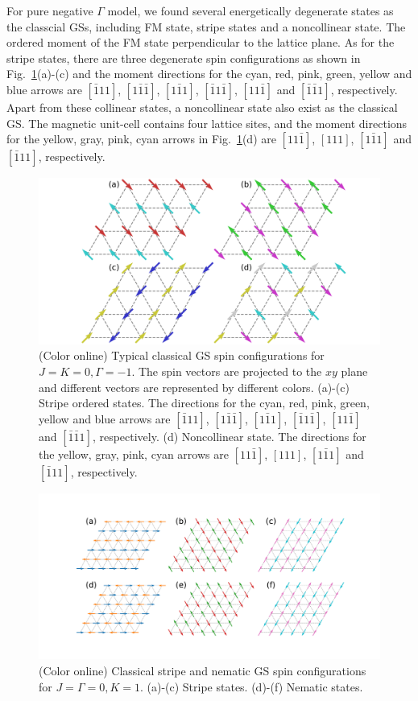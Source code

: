 \documentclass[aps,prb,reprint,amsfonts,amsmath,amssymb,showpacs,groupedaddress,superscriptaddress]{revtex4-1}
\begin{document}
For pure negative $\Gamma$ model, we found several energetically degenerate states as the classcial GSs, including FM state, stripe states and a noncollinear state. The ordered moment of the FM state perpendicular to the lattice plane. As for the stripe states, there are three degenerate spin configurations as shown in Fig.~\ref{fig:GSForNegativeGamma}(a)-(c) and the moment directions for the cyan, red, pink, green, yellow and blue arrows are $[\bar{1}11]$, $[1\bar{1}\bar{1}]$, $[1\bar{1}1]$, $[\bar{1}1\bar{1}]$, $[11\bar{1}]$ and $[\bar{1}\bar{1}1]$, respectively. Apart from these collinear states, a noncollinear state also exist as the classical GS. The magnetic unit-cell contains four lattice sites, and the moment directions for the yellow, gray, pink, cyan arrows in Fig.~\ref{fig:GSForNegativeGamma}(d) are $[11\bar{1}]$, $[111]$, $[1\bar{1}1]$ and $[\bar{1}11]$, respectively.
\begin{figure}
    \includegraphics[width=\columnwidth]{SpinConfigForNegativeGamma.pdf}
    \caption{\label{fig:GSForNegativeGamma}(Color online) Typical classical GS spin configurations for $J=K=0, \Gamma=-1$. The spin vectors are projected to the $xy$ plane and different vectors are represented by different colors. (a)-(c) Stripe ordered states. The directions for the cyan, red, pink, green, yellow and blue arrows are $[\bar{1}11]$, $[1\bar{1}\bar{1}]$, $[1\bar{1}1]$, $[\bar{1}1\bar{1}]$, $[11\bar{1}]$ and $[\bar{1}\bar{1}1]$, respectively. (d) Noncollinear state. The directions for the yellow, gray, pink, cyan arrows are $[11\bar{1}]$, $[111]$, $[1\bar{1}1]$ and $[\bar{1}11]$, respectively.}
\end{figure}
\begin{figure}
    \includegraphics[width=\columnwidth]{SpinConfigForPositiveKitaev.pdf}
    \caption{\label{fig:GSForPositiveK}(Color online) Classical stripe and nematic GS spin configurations for $J=\Gamma=0, K=1$. (a)-(c) Stripe states. (d)-(f) Nematic states.}
\end{figure}
\end{document}
